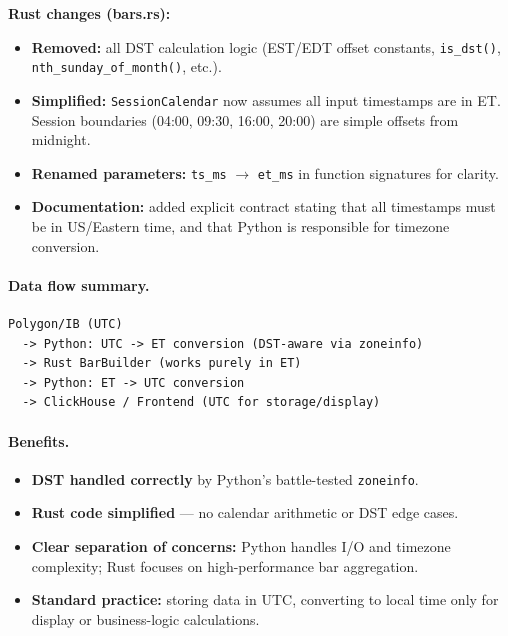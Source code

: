 \documentclass[a4paper, 11pt]{article}
\begin{document}
\textbf{Rust changes (bars.rs):}
\begin{itemize}[nosep]
    \item \textbf{Removed:} all DST calculation logic (EST/EDT offset constants,
          \texttt{is\_dst()}, \texttt{nth\_sunday\_of\_month()}, etc.).
    \item \textbf{Simplified:} \texttt{SessionCalendar} now assumes all input
          timestamps are in ET.  Session boundaries (04:00, 09:30, 16:00, 20:00)
          are simple offsets from midnight.
    \item \textbf{Renamed parameters:} \texttt{ts\_ms} $\to$ \texttt{et\_ms} in
          function signatures for clarity.
    \item \textbf{Documentation:} added explicit contract stating that all
          timestamps must be in US/Eastern time, and that Python is responsible
          for timezone conversion.
\end{itemize}

\paragraph{Data flow summary.}
\begin{verbatim}
Polygon/IB (UTC)
  -> Python: UTC -> ET conversion (DST-aware via zoneinfo)
  -> Rust BarBuilder (works purely in ET)
  -> Python: ET -> UTC conversion
  -> ClickHouse / Frontend (UTC for storage/display)
\end{verbatim}

\paragraph{Benefits.}
\begin{itemize}[nosep]
    \item \textbf{DST handled correctly} by Python's battle-tested \texttt{zoneinfo}.
    \item \textbf{Rust code simplified} --- no calendar arithmetic or DST edge cases.
    \item \textbf{Clear separation of concerns:} Python handles I/O and timezone
          complexity; Rust focuses on high-performance bar aggregation.
    \item \textbf{Standard practice:} storing data in UTC, converting to local time
          only for display or business-logic calculations.
\end{itemize}

\pagebreak
\end{document}
